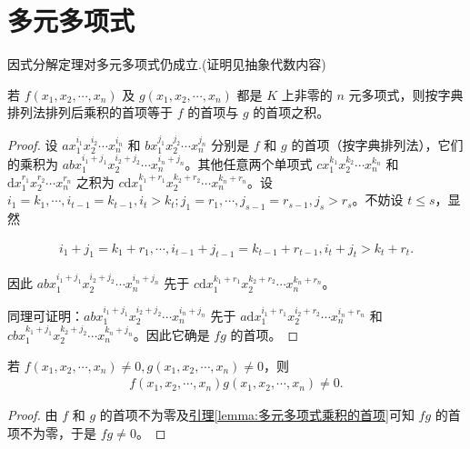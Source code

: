 \documentclass[../../main.tex]{subfiles}%
\begin{document}
\section{多元多项式}

因式分解定理对多元多项式仍成立.(证明见抽象代数内容)

\begin{lemma}\label{lemma:多元多项式乘积的首项}
若 $f(x_1, x_2, \cdots, x_n)$ 及 $g(x_1, x_2, \cdots, x_n)$ 都是 $K$ 上非零的 $n$ 元多项式，则按字典排列法排列后乘积的首项等于 $f$ 的首项与 $g$ 的首项之积。
\end{lemma}
\begin{proof}
设 $ax_1^{i_1} x_2^{i_2} \cdots x_n^{i_n}$ 和 $bx_1^{j_1} x_2^{j_2} \cdots x_n^{j_n}$ 分别是 $f$ 和 $g$ 的首项（按字典排列法），它们的乘积为 $abx_1^{i_1 + j_1} x_2^{i_2 + j_2} \cdots x_n^{i_n + j_n}$。其他任意两个单项式 $cx_1^{k_1} x_2^{k_2} \cdots x_n^{k_n}$ 和 $\mathrm{d}x_1^{r_1} x_2^{r_2} \cdots x_n^{r_n}$ 之积为 $c\mathrm{d}x_1^{k_1 + r_1} x_2^{k_2 + r_2} \cdots x_n^{k_n + r_n}$。设 $i_1 = k_1, \cdots, i_{t-1} = k_{t-1}, i_t > k_t; j_1 = r_1, \cdots, j_{s-1} = r_{s-1}, j_s > r_s$。不妨设 $t \leqslant  s$，显然

\begin{align*}
i_1 + j_1 = k_1 + r_1, \cdots, i_{t-1} + j_{t-1} = k_{t-1} + r_{t-1}, i_t + j_t > k_t + r_t.
\end{align*}

因此 $abx_1^{i_1 + j_1} x_2^{i_2 + j_2} \cdots x_n^{i_n + j_n}$ 先于 $c\mathrm{d}x_1^{k_1 + r_1} x_2^{k_2 + r_2} \cdots x_n^{k_n + r_n}$。

同理可证明：$abx_1^{i_1 + j_1} x_2^{i_2 + j_2} \cdots x_n^{i_n + j_n}$ 先于 $a\mathrm{d}x_1^{i_1 + r_1} x_2^{i_2 + r_2} \cdots x_n^{i_n + r_n}$ 和 $cbx_1^{k_1 + j_1} x_2^{k_2 + j_2} \cdots x_n^{k_n + j_n}$。因此它确是 $fg$ 的首项。
\end{proof}

\begin{proposition}[多元多项式的整性]\label{proposition:多元多项式的整性}
若 $f(x_1, x_2, \cdots, x_n) \neq 0, g(x_1, x_2, \cdots, x_n) \neq 0$，则
\begin{align*}
f(x_1, x_2, \cdots, x_n)g(x_1, x_2, \cdots, x_n) \neq 0.
\end{align*}
\end{proposition}
\begin{proof}
由 $f$ 和 $g$ 的首项不为零及\hyperref[lemma:多元多项式乘积的首项]{引理\ref{lemma:多元多项式乘积的首项}}可知 $fg$ 的首项不为零，于是 $fg \neq 0$。
\end{proof}
\end{document}
